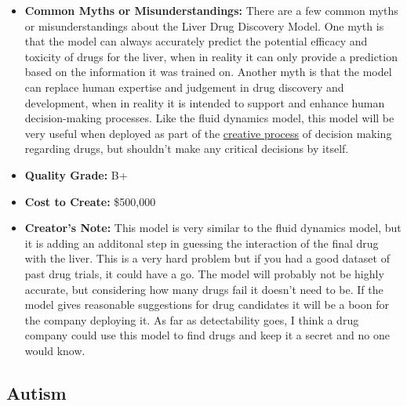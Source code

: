 \begin{itemize}
    \item \textbf{Common Myths or Misunderstandings:} There are a few common myths or misunderstandings about the Liver Drug Discovery Model. One myth is that the model can always accurately predict the potential efficacy and toxicity of drugs for the liver, when in reality it can only provide a prediction based on the information it was trained on.  Another myth is that the model can replace human expertise and judgement in drug discovery and development, when in reality it is intended to support and enhance human decision-making processes. Like the fluid dynamics model, this model will be very useful when deployed as part of the \hyperref[sec:creative]{creative process} of decision making regarding drugs, but shouldn't make any critical decisions by itself. 
    \item \textbf{Quality Grade:} B+
    \item \textbf{Cost to Create:} \$500,000
    \item \textbf{Creator's Note:} This model is very similar to the fluid dynamics model, but it is adding an additonal step in guessing the interaction of the final drug with the liver. This is a very hard problem but if you had a good dataset of past drug trials, it could have a go. The model will probably not be highly accurate, but considering how many drugs fail it doesn't need to be. If the model gives reasonable suggestions for drug candidates it will be a boon for the company deploying it. As far as detectability goes, I think a drug company could use this model to find drugs and keep it a secret and no one would know.
\end{itemize}

\subsection{Autism}

